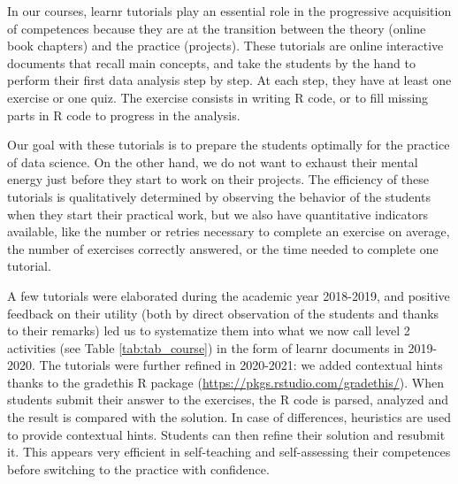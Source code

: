 \documentclass{aims}
\theoremstyle{definition}
\begin{document}
In our courses, learnr tutorials play an essential role in the
progressive acquisition of competences because they are at the
transition between the theory (online book chapters) and the practice
(projects). These tutorials are online interactive documents that recall
main concepts, and take the students by the hand to perform their first
data analysis step by step. At each step, they have at least one
exercise or one quiz. The exercise consists in writing R code, or to
fill missing parts in R code to progress in the analysis.

Our goal with these tutorials is to prepare the students optimally for
the practice of data science. On the other hand, we do not want to
exhaust their mental energy just before they start to work on their
projects. The efficiency of these tutorials is qualitatively determined
by observing the behavior of the students when they start their
practical work, but we also have quantitative indicators available, like
the number or retries necessary to complete an exercise on average, the
number of exercises correctly answered, or the time needed to complete
one tutorial.

A few tutorials were elaborated during the academic year 2018-2019, and
positive feedback on their utility (both by direct observation of the
students and thanks to their remarks) led us to systematize them into
what we now call level 2 activities (see Table \ref {tab:tab_course}) in
the form of learnr documents in 2019-2020. The tutorials were further
refined in 2020-2021: we added contextual hints thanks to the gradethis
R package (\url{https://pkgs.rstudio.com/gradethis/}). When students
submit their answer to the exercises, the R code is parsed, analyzed and
the result is compared with the solution. In case of differences,
heuristics are used to provide contextual hints. Students can then
refine their solution and resubmit it. This appears very efficient in
self-teaching and self-assessing their competences before switching to
the practice with confidence.
\end{document}
